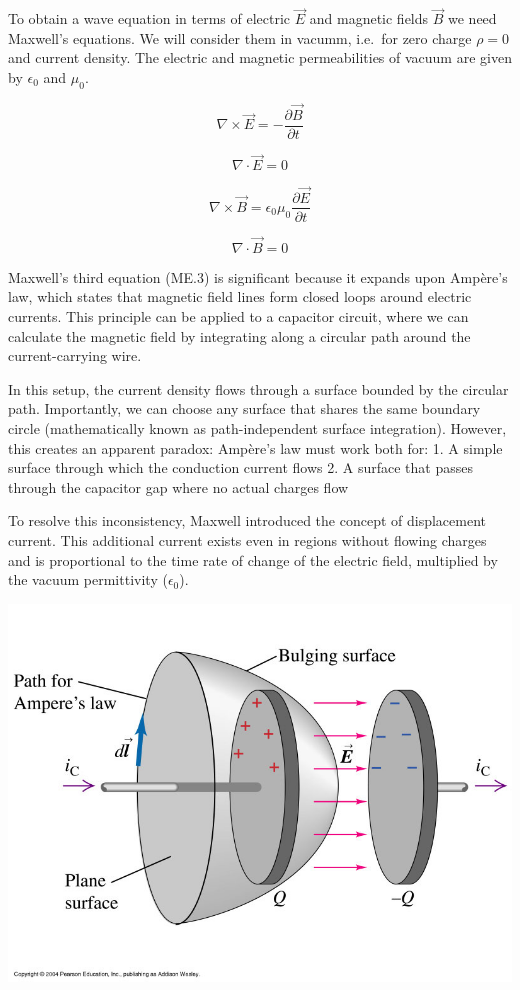 \documentclass[
  a4paper,
]{book}
\begin{document}
To obtain a wave equation in terms of electric \(\vec{E}\) and magnetic
fields \(\vec{B}\) we need Maxwell's equations. We will consider them in
vacumm, i.e.~for zero charge \(\rho=0\) and current density. The
electric and magnetic permeabilities of vacuum are given by
\(\epsilon_0\) and \(\mu_0\).

\[
\nabla \times \vec{E}=-\frac{\partial \vec{B}}{\partial t}
\label{eq:ME1}\tag{ME.1}
\]

\[
\nabla\cdot\vec{E}=0
\tag{ME.2}
\]

\[
\nabla\times \vec{B}=\epsilon_0\mu_0\frac{\partial \vec{E}}{\partial t}
\tag{ME.3}
\]

\[
\nabla\cdot \vec{B}=0
\tag{ME.4}
\]

Maxwell's third equation (ME.3) is significant because it expands upon
Ampère's law, which states that magnetic field lines form closed loops
around electric currents. This principle can be applied to a capacitor
circuit, where we can calculate the magnetic field by integrating along
a circular path around the current-carrying wire.

In this setup, the current density flows through a surface bounded by
the circular path. Importantly, we can choose any surface that shares
the same boundary circle (mathematically known as path-independent
surface integration). However, this creates an apparent paradox:
Ampère's law must work both for: 1. A simple surface through which the
conduction current flows 2. A surface that passes through the capacitor
gap where no actual charges flow

To resolve this inconsistency, Maxwell introduced the concept of
displacement current. This additional current exists even in regions
without flowing charges and is proportional to the time rate of change
of the electric field, multiplied by the vacuum permittivity
(\(\epsilon_{0}\)).

\begin{center}
\includegraphics[width=0.5\linewidth,height=\textheight,keepaspectratio]{electromagnetic-waves/img/diplacement_current.jpg}
\end{center}
\end{document}

